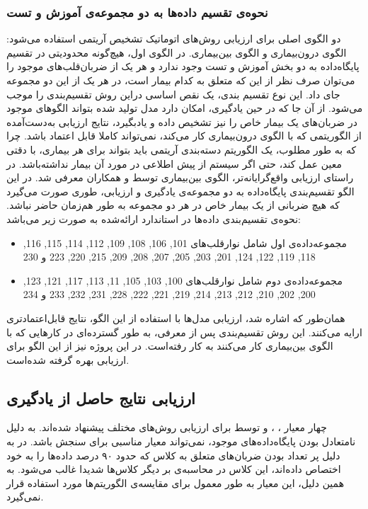 		\subsubsection{نحوه‌ی تقسیم داده‌ها به دو مجموعه‌ی آموزش و تست}
		دو الگوی اصلی برای ارزیابی روش‌های اتوماتیک تشخیص آریتمی استفاده می‌شود: الگوی درون‌بیماری و الگوی بین‌بیماری. در الگوی اول، هیچ‌گونه محدودیتی در تقسیم پایگاه‌داده به دو بخش آموزش و تست وجود ندارد و هر یک از ضربان‌قلب‌های موجود را می‌توان صرف نظر از این که متعلق به کدام بیمار است، در هر یک از این دو مجموعه جای داد. این نوع تقسیم بندی، یک نقص اساسی دراین روش تقسیم‌بندی را موجب می‌شود. از آن جا که در حین یادگیری، امکان دارد مدل تولید شده بتواند الگوهای موجود در ضربان‌های یک بیمار خاص را نیز تشخیص داده و یادبگیرد، نتایج ارزیابی به‌دست‌آمده از الگوریتمی که با الگوی درون‌بیماری کار می‌کند، نمی‌تواند کاملا قابل اعتماد باشد. چرا که به طور مطلوب، یک الگوریتم دسته‌بندی آریتمی باید بتواند برای هر بیماری، با دقتی معین عمل کند، حتی اگر سیستم از پیش اطلاعی در مورد آن بیمار نداشته‌باشد. 
در راستای ارزیابی واقع‌گرایانه‌تر، الگوی بین‌بیماری توسط  و همکاران معرفی شد.\cite{deChazal2004} در این الگو تقسیم‌بندی پایگاه‌داده به دو مجموعه‌ی یادگیری و ارزیابی، طوری صورت می‌گیرد که هیچ ضربانی از یک بیمار خاص در هر دو مجموعه به طور هم‌زمان حاضر نباشد. نحوه‌ی تقسیم‌بندی داده‌ها در استاندارد ارائه‌شده به صورت زیر می‌باشد:
\begin{itemize}
	\item مجموعه‌داده‌ی اول  شامل نوارقلب‌های 101, 106, 108, 109, 112, 114, 115, 116, 118,
119, 122, 124, 201, 203, 205, 207, 208, 209, 215, 220, 223 و
230
	\item مجموعه‌داده‌ی دوم  شامل نوارقلب‌های 100, 103, 105, 11, 113, 117, 121, 123,
200, 202, 210, 212, 213, 214, 219, 221, 222, 228, 231, 232, 233
و 234
\end{itemize}
 همان‌طور که اشاره شد، ارزیابی مدل‌ها با استفاده از این الگو، نتایج قابل‌اعتمادتری ارایه می‌کنند. این روش تقسیم‌بندی پس از معرفی، به طور گسترده‌ای در کارهایی که با الگوی بین‌بیماری کار می‌کنند به کار رفته‌است. در این پروژه نیز از این الگو برای ارزیابی بهره گرفته شده‌است. 



	\subsection{ارزیابی نتایج حاصل از یادگیری}
	چهار معیار ، ،  و   توسط  برای ارزیابی روش‌های مختلف پیشنهاد شده‌اند. 
به دلیل نامتعادل بودن پایگاه‌داده‌های موجود،  نمی‌تواند معیار مناسبی برای سنجش باشد. در به دلیل پر تعداد بودن ضربان‌های متعلق به کلاس  که حدود ۹۰ درصد داده‌ها را به خود اختصاص داده‌اند،‌ این کلاس در محاسبه‌ی  بر دیگر کلاس‌ها شدیدا غالب می‌شود. به همین دلیل، این معیار به طور معمول برای مقایسه‌ی الگوریتم‌ها مورد استفاده قرار نمی‌گیرد.

